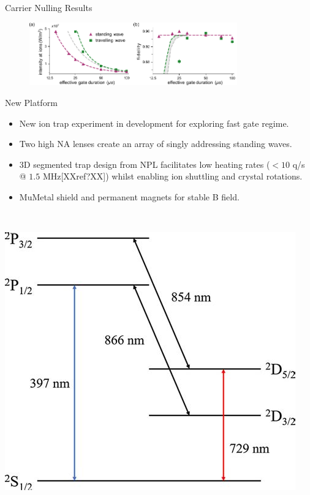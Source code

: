 \documentclass[final]{beamer}
\begin{document}
\begin{frame}{}
\begin{center}
\begin{columns}[t]
\begin{column}{0.49\textwidth}
\begin{alertblock}{Carrier Nulling Results}
\begin{minipage}{0.34\linewidth}
\begin{figure}
      \end{figure}
      \end{minipage}
      \begin{figure}
        \includegraphics[width=0.8\textwidth]{./figs/two_qubit_gate_figure_h.pdf}
      \end{figure}
    \end{alertblock}


    \begin{alertblock}{New Platform}
      \begin{minipage}{0.58\textwidth}
      \begin{itemize}
      \item New ion trap experiment in development for exploring fast
        gate regime.
      \item Two high NA lenses create an array of singly
        addressing standing waves.
      \item 3D segmented trap design from NPL facilitates low heating
        rates ($<10$ q/s @ $1.5$ MHz[XXref?XX]) whilst enabling ion shuttling and crystal rotations.
      \item MuMetal shield and permanent magnets for stable B field.
      \end{itemize}
      \end{minipage}
      ~~
      \begin{minipage}{0.35\textwidth}
      \includegraphics[width=0.94\textwidth]{./figs/ca_struct_tmp.jpeg}
      \end{minipage}


\end{alertblock}
\end{column}
\end{columns}
\end{center}
\end{frame}
\end{document}
